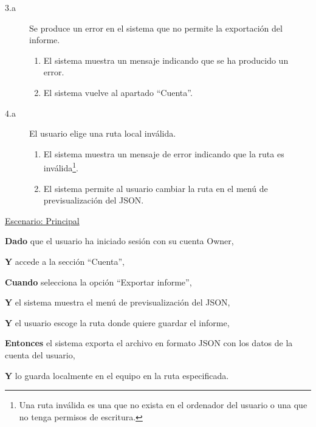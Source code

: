 \begin{description}
    \item[3.a] Se produce un error en el sistema que no permite la exportación del informe.
    \begin{enumerate}
        \item[3.a.1] El sistema muestra un mensaje indicando que se ha producido un error.
        \item[3.a.2] El sistema vuelve al apartado \enquote{Cuenta}.
    \end{enumerate}

    \newpage %

    \item[4.a] El usuario elige una ruta local inválida.
    \begin{enumerate}
        \item[4.a.1] El sistema muestra un mensaje de error indicando que la ruta es inválida\footnote{Una ruta inválida es una que no exista en el ordenador del usuario o una que no tenga permisos de escritura.}.
        \item[4.a.2] El sistema permite al usuario cambiar la ruta en el menú de previsualización del JSON.
    \end{enumerate}

\end{description}

\underline{Escenario: Principal}\par
\vspace{0.15cm}
\textbf{Dado} que el usuario ha iniciado sesión con su cuenta Owner,\par 
\textbf{Y} accede a la sección \enquote{Cuenta},\par 
\textbf{Cuando} selecciona la opción \enquote{Exportar informe},\par
\textbf{Y} el sistema muestra el menú de previsualización del JSON,\par
\textbf{Y} el usuario escoge la ruta donde quiere guardar el informe,\par
\textbf{Entonces} el sistema exporta el archivo en formato JSON con los datos de la cuenta del usuario,\par
\textbf{Y} lo guarda localmente en el equipo en la ruta especificada.\par
\vspace{0.20cm}

